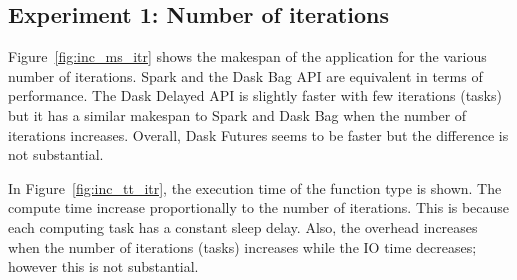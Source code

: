 \documentclass[conference]{IEEEtran}
\begin{document}
\subsection{Experiment 1: Number of iterations}
Figure~\ref{fig:inc_ms_itr} shows the makespan of the application for the various
number of iterations. Spark and the Dask Bag API are equivalent in terms of
performance. The Dask Delayed API is slightly faster with few iterations (tasks) but
it has a similar makespan to Spark and Dask Bag when the number of iterations
increases. Overall, Dask Futures seems to be faster but the difference is not
substantial.

In Figure~\ref{fig:inc_tt_itr}, the execution time of the function type is shown. The
compute time increase proportionally to the number of iterations. This is because
each computing task has a constant sleep delay. Also, the overhead increases when the
number of iterations (tasks) increases while the IO time decreases; however this is
not substantial.


\end{document}
